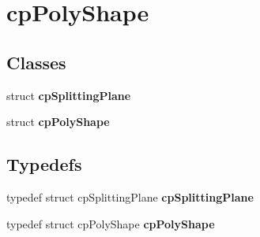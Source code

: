 \hypertarget{group__cp_poly_shape}{\section{cp\-Poly\-Shape}
\label{group__cp_poly_shape}
}
\subsection*{Classes}
\begin{DoxyCompactItemize}
\item 
struct {\bfseries cp\-Splitting\-Plane}
\item 
struct {\bfseries cp\-Poly\-Shape}
\end{DoxyCompactItemize}
\subsection*{Typedefs}
\begin{DoxyCompactItemize}
\item 
\hypertarget{group__cp_poly_shape_ga1974848d5187f4deb72efdf36720c858}{typedef struct cp\-Splitting\-Plane {\bfseries cp\-Splitting\-Plane}}\label{group__cp_poly_shape_ga1974848d5187f4deb72efdf36720c858}

\item 
\hypertarget{group__cp_poly_shape_ga6b68c9908e0ca503d8d90446ae05442c}{typedef struct cp\-Poly\-Shape {\bfseries cp\-Poly\-Shape}}\label{group__cp_poly_shape_ga6b68c9908e0ca503d8d90446ae05442c}

\end{DoxyCompactItemize}
